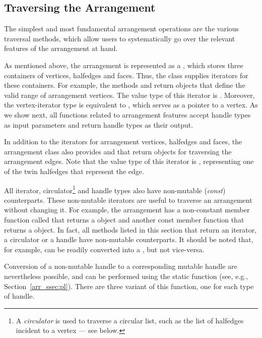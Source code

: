 \subsection{Traversing the Arrangement}
\label{arr_ssec:traverse}
%
The simplest and most fundamental arrangement operations are the
various traversal methods, which allow users to systematically go
over the relevant features of the arrangement at hand.

As mentioned above, the arrangement is represented as a \dcel,
which stores three containers of vertices, halfedges and faces. Thus,
the  class supplies iterators for these
containers. For example, the methods  and
 return 
objects that define the valid range of arrangement vertices. The value
type of this iterator is . Moreover, the
vertex-iterator type is equivalent to
, which serves as a pointer to a
vertex. As we show next, all functions related to arrangement features
accept handle types as input parameters and return handle types as
their output.

In addition to the iterators for arrangement vertices, halfedges
and faces, the arrangement class also provides 
and  that return
 objects for traversing the
arrangement edges. Note that the value type of this iterator is
, representing one of the twin
halfedges that represent the edge.

All iterator, circulator\footnote{A {\em circulator} is used to
traverse a circular list, such as the list of halfedges incident to
a vertex --- see below.} and handle types also have non-mutable
({\em const}) counterparts. These non-mutable iterators are useful
to traverse an arrangement without changing it. For example,
the arrangement has a
non-constant member function called  that
returns a  object and another const member
function that returns a  object. In fact,
all methods listed in this section that return an iterator, a
circulator or a handle have non-mutable counterparts. It should be
noted that, for example,  can be readily converted
into a , but not vice-versa.

Conversion of a non-mutable handle to a corresponding mutable
handle are nevertheless possible, and can be performed using the
static function  (see, e.g.,
Section~\ref{arr_ssec:pl}). There are
three variant of this function, one for each type of handle.

